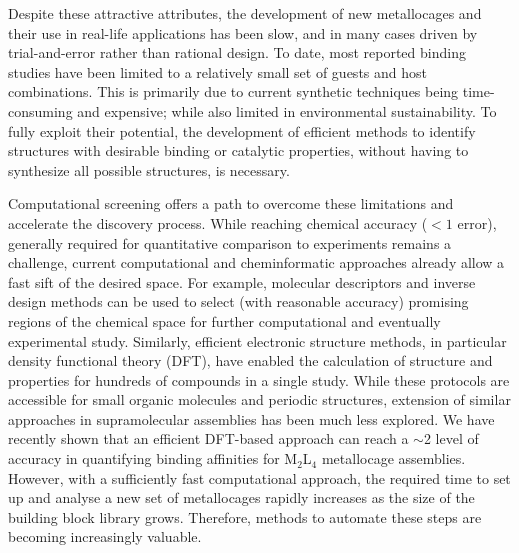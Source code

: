 \documentclass[../../main.tex]{subfiles}
\newcommand{\MLf}{M$_2$L$_4$ }
\begin{document}
Despite these attractive attributes, the development of new metallocages and their use in real-life applications has been slow, and in many cases driven by trial-and-error rather than rational design. To date, most reported binding studies have been limited to a relatively small set of guests and host combinations. This is primarily due to current synthetic techniques being time-consuming and expensive; while also limited in environmental sustainability.\cite{Erythropel2018} To fully exploit their potential, the development of efficient methods to identify structures with desirable binding or catalytic properties, without having to synthesize all possible structures, is necessary. 

Computational screening offers a path to overcome these limitations and accelerate the discovery process.\cite{Poree2017} While reaching chemical accuracy ($<1$ \kcalx error), generally required for quantitative comparison to experiments remains a challenge,\cite{Neese2019} current computational and cheminformatic approaches already allow a fast sift of the desired space. For example, molecular descriptors\cite{Xu2002, Durand2019, Greenaway2018} and inverse design methods\cite{Freeze2019} can be used to select (with reasonable accuracy) promising regions of the chemical space for further computational and eventually experimental study.\cite{Foscato2020} Similarly, efficient electronic structure methods, in particular density functional theory (DFT), have enabled the calculation of structure and properties for hundreds of compounds in a single study.\cite{Rosales2019, Guan2018} While these protocols are accessible for small organic molecules and periodic structures, extension of similar approaches in supramolecular assemblies has been much less explored.\cite{Hachmann2011} We have recently shown that an efficient DFT-based approach can reach a $\sim$2 \kcalx level of accuracy in quantifying binding affinities for \MLf metallocage assemblies.\cite{Young2019} However, with a sufficiently fast computational approach, the required time to set up and analyse a new set of metallocages rapidly increases as the size of the building block library grows. Therefore, methods to automate these steps are becoming increasingly valuable. 
\end{document}
